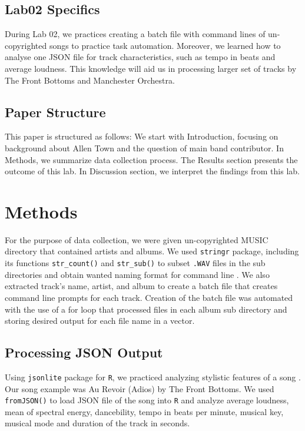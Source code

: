 \documentclass{article}\usepackage[]{graphicx}\usepackage[]{xcolor}
\begin{document}
\begin{multicols}{2}
\subsection{Lab02 Specifics}

During Lab 02, we practices creating a batch file with command lines of un-copyrighted songs to practice task automation. Moreover, we learned how to analyse one JSON file for track characteristics, such as tempo in beats and average loudness. This knowledge will aid us in processing larger set of tracks by The Front Bottoms and Manchester Orchestra.
\columnbreak

\subsection{Paper Structure}

This paper is structured as follows: We start with Introduction, focusing on background about Allen Town and the question of main band contributor. In Methods, we summarize data collection process. The Results section presents the outcome of this lab. In Discussion section, we interpret the findings from this lab.

\section{Methods}
For the purpose of data collection, we were given un-copyrighted MUSIC directory that contained artists and albums. We used \texttt{stringr} package, including its functions \texttt{str\_count()} and \texttt{str\_sub()} to subset \texttt{.WAV} files in the sub directories and obtain wanted naming format for command line \citep{stringr}. We also extracted track's name, artist, and album to create a batch file that creates command line prompts for each track. Creation of the batch file was automated with the use of a for loop that processed files in each album sub directory and storing desired output for each file name in a vector.


\subsection{Processing JSON Output}
Using \texttt{jsonlite} package for \texttt{R}, we practiced analyzing stylistic features of a song \citep{jsonlite}. Our song example was Au Revoir (Adios) by The Front Bottoms. We used \texttt{fromJSON()} to load JSON file of the song into \texttt{R} and analyze average loudness, mean of spectral energy, dancebility, tempo in beats per minute, musical key, musical mode and duration of the track in seconds. 


\end{multicols}
\end{document}
